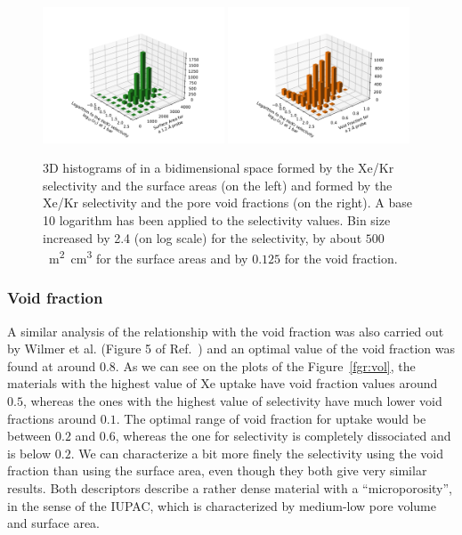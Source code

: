 \documentclass[main.tex]{subfiles}
\begin{document}
\begin{figure}[h!]
  \centering
  \includegraphics[width=0.48\textwidth]{figures/2-thermo/3D_hist_selec_SA.pdf}
  \includegraphics[width=0.48\textwidth]{figures/2-thermo/3D_hist_selec_vol.pdf}
  \caption{3D histograms of in a bidimensional space formed by the Xe/Kr selectivity and the surface areas (on the left) and formed by the Xe/Kr selectivity and the pore void fractions (on the right). A base 10 logarithm has been applied to the selectivity values. Bin size increased by 2.4 (on log scale) for the selectivity, by about $500$~\si{\square\meter\cubic\centi\meter} for the surface areas and by $0.125$ for the void fraction. }\label{fgr:3D_hist_sa_vol}
\end{figure}

\subsubsection{Void fraction}

A similar analysis of the relationship with the void fraction was also carried out by Wilmer et al. (Figure 5 of Ref.~\cite{Wilmer_2012}) and an optimal value of the void fraction was found at around $0.8$. As we can see on the plots of the Figure~\ref{fgr:vol}, the materials with the highest value of Xe uptake have void fraction values around $0.5$, whereas the ones with the highest value of selectivity have much lower void fractions around $0.1$. The optimal range of void fraction for uptake would be between $0.2$ and $0.6$, whereas the one for selectivity is completely dissociated and is below $0.2$. We can characterize a bit more finely the selectivity using the void fraction than using the surface area, even though they both give very similar results. Both descriptors describe a rather dense material with a ``microporosity'', in the sense of the IUPAC\cite{Sing_1985}, which is characterized by medium-low pore volume and surface area.
\end{document}
